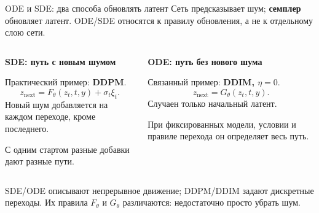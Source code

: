 \documentclass[aspectratio=169,10pt]{beamer}
\newcommand{\takeaway}[1]{\par\vspace{1.5mm}{\bfseries #1\par}}
\newcommand{\smalltext}[1]{{\fontsize{10}{12}\selectfont #1\par}}
\begin{document}
\begin{frame}[t]{ODE и SDE: два способа обновлять латент}
  Сеть предсказывает шум; \textbf{семплер} обновляет латент.
  ODE/SDE относятся к правилу обновления, а не к отдельному слою сети.
  \begin{columns}[T,onlytextwidth]
    \begin{column}{.48\textwidth}
      {\bfseries SDE: путь с новым шумом\par}
      Практический пример: \textbf{DDPM}.
      \[
        z_{\mathrm{next}}=F_\theta(z_t,t,y)+\sigma_t\xi_t.
      \]
      Новый шум добавляется на каждом переходе, кроме последнего.
      \par С одним стартом разные добавки дают разные пути.
    \end{column}
    \begin{column}{.48\textwidth}
      {\bfseries ODE: путь без нового шума\par}
      Связанный пример: \textbf{DDIM, $\eta=0$}.
      \[
        z_{\mathrm{next}}=G_\theta(z_t,t,y).
      \]
      Случаен только начальный латент.
      \par При фиксированных модели, условии и правиле перехода он определяет весь путь.
    \end{column}
  \end{columns}
  \vspace{1mm}
  \smalltext{SDE/ODE описывают непрерывное движение; DDPM/DDIM задают дискретные
  переходы. Их правила $F_\theta$ и $G_\theta$ различаются: недостаточно просто убрать шум.}
  \takeaway{При оценке DiT тоже работает DDPM.\par
  Новый шум добавляется не только при калибровке.}
\end{frame}
\end{document}
